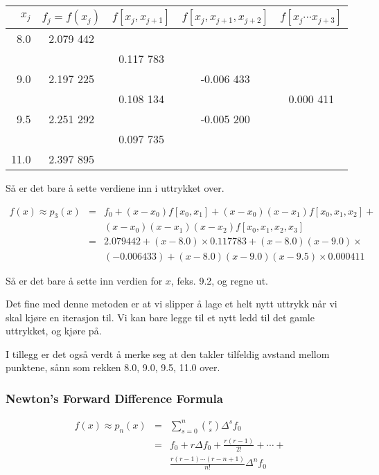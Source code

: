 \documentclass[norsk, a4paper, 12pt, titlepage]{article}
\begin{document}
\begin{tabular}{rc|ccc}
\hline
$x_{j}$ & $f_{j} = f(x_{j})$ & $f[x_{j}, x_{j+1}]$ & $f[x_{j},
x_{j+1}, x_{j+2}]$ & $f[x_{j} \cdots x_{j+3}]$ \\
\hline

8.0  & 2.079 442 &           &            &           \\
     &           & 0.117 783 &            &           \\
9.0  & 2.197 225 &           & -0.006 433 &           \\
     &           & 0.108 134 &            & 0.000 411 \\
9.5  & 2.251 292 &           & -0.005 200 &           \\
     &           & 0.097 735 &            &           \\
11.0 & 2.397 895 &           &            &           \\
\hline
\end{tabular}

Så er det bare å sette verdiene inn i uttrykket over.

\begin{eqnarray*}
f(x) \approx p_{3}(x) & = & f_{0} + (x - x_{0})f[x_{0}, x_{1}] + (x -
x_{0})(x - x_{1})f[x_{0}, x_{1}, x_{2}] +\\
& & (x - x_{0})(x - x_{1})(x - x_{2})f[x_{0}, x_{1}, x_{2}, x_{3}] \\
& = & 2.079 442 + (x - 8.0)\times 0.117 783 + (x - 8.0)(x - 9.0)
\times\\
& & (-0.006 433) + (x - 8.0)(x - 9.0)(x - 9.5) \times 0.000 411
\end{eqnarray*}

Så er det bare å sette inn verdien for $x$, feks. 9.2, og regne ut.

Det fine med denne metoden er at vi slipper å lage et helt nytt
uttrykk når vi skal kjøre en iterasjon til.  Vi kan bare legge til et
nytt ledd til det gamle uttrykket, og kjøre på.

I tillegg er det også verdt å merke seg at den takler tilfeldig
avstand mellom punktene, sånn som rekken 8.0, 9.0, 9.5, 11.0 over.

\subsubsection{Newton's Forward Difference Formula}
\begin{eqnarray*}
f(x) \approx p_{n}(x) & = & \sum_{s=0}^{n} \binom{r}{s}
\Delta^{s}f_{0} \\
& = & f_{0} + r\Delta f_{0} + \frac{r(r - 1)}{2!} + \cdots + \\
& & \frac{r(r - 1)\cdots (r - n + 1)}{n!}\Delta^{n}f_{0}
\end{eqnarray*}
\end{document}
